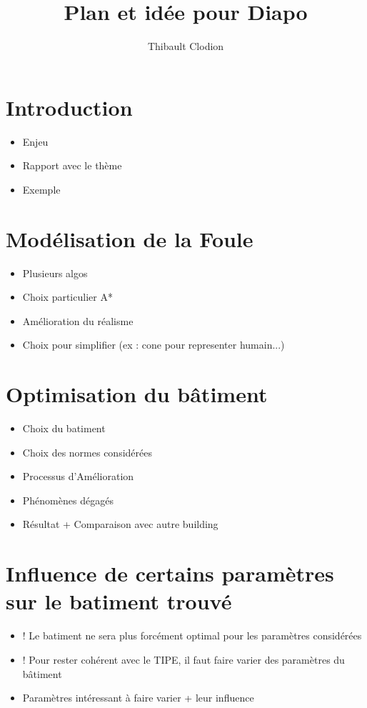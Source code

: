 \documentclass[12pt]{article}
\title{Plan et idée pour Diapo}
\author{Thibault Clodion}
\begin{document}
\maketitle %

\section{Introduction}

\begin{itemize}
    \item Enjeu
    \item Rapport avec le thème
    \item Exemple
\end{itemize}

\section{Modélisation de la Foule}

\begin{itemize}
    \item Plusieurs algos
    \item Choix particulier A*
    \item Amélioration du réalisme
    \item Choix pour simplifier (ex : cone pour representer humain...)
\end{itemize}

\section{Optimisation du bâtiment}

\begin{itemize}
    \item Choix du batiment
    \item Choix des normes considérées
    \item Processus d'Amélioration
    \item Phénomènes dégagés
    \item Résultat + Comparaison avec autre building
\end{itemize}

\section{Influence de certains paramètres sur le batiment trouvé}

\begin{itemize}
    \item ! Le batiment ne sera plus forcément optimal pour les paramètres considérées
    \item ! Pour rester cohérent avec le TIPE, il faut faire varier des paramètres du bâtiment
    \item Paramètres intéressant à faire varier + leur influence
\end{itemize}
\end{document}
